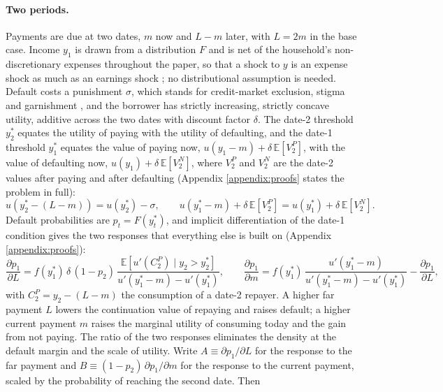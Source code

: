 \paragraph{Two periods.} Payments are due at two dates, $m$ now and $L - m$ later, with $L = 2m$ in the base case. Income $y_1$ is drawn from a distribution $F$ and is net of the household's non-discretionary expenses throughout the paper, so that a shock to $y$ is an expense shock as much as an earnings shock \citep{fulford_expense_2024}; no distributional assumption is needed. Default costs a punishment $\sigma$, which stands for credit-market exclusion, stigma and garnishment \citep{indarte_moral_2023}, and the borrower has strictly increasing, strictly concave utility, additive across the two dates with discount factor $\delta$. The date-2 threshold $y_2^*$ equates the utility of paying with the utility of defaulting, and the date-1 threshold $y_1^*$ equates the value of paying now, $u(y_1 - m) + \delta\,\mathbb{E}[V_2^P]$, with the value of defaulting now, $u(y_1) + \delta\,\mathbb{E}[V_2^N]$, where $V_2^P$ and $V_2^N$ are the date-2 values after paying and after defaulting (Appendix \ref{appendix:proofs} states the problem in full):
\begin{equation}\label{eq:threshold1}
u(y_2^* - (L - m)) = u(y_2^*) - \sigma, \qquad u(y_1^* - m) + \delta\,\mathbb{E}[V_2^P] = u(y_1^*) + \delta\,\mathbb{E}[V_2^N].
\end{equation}
Default probabilities are $p_t = F(y_t^*)$, and implicit differentiation of the date-1 condition gives the two responses that everything else is built on (Appendix \ref{appendix:proofs}):
\begin{equation}\label{eq:sensitivities}
\frac{\partial p_1}{\partial L} = f(y_1^*)\,\delta\,(1 - p_2)\,\frac{\mathbb{E}\left[u'(C_2^P) \mid y_2 > y_2^*\right]}{u'(y_1^* - m) - u'(y_1^*)}, \qquad
\frac{\partial p_1}{\partial m} = f(y_1^*)\,\frac{u'(y_1^* - m)}{u'(y_1^* - m) - u'(y_1^*)} - \frac{\partial p_1}{\partial L},
\end{equation}
with $C_2^P = y_2 - (L - m)$ the consumption of a date-2 repayer. A higher far payment $L$ lowers the continuation value of repaying and raises default; a higher current payment $m$ raises the marginal utility of consuming today and the gain from not paying. The ratio of the two responses eliminates the density at the default margin and the scale of utility. Write $A \equiv \partial p_1/\partial L$ for the response to the far payment and $B \equiv (1 - p_2)\,\partial p_1/\partial m$ for the response to the current payment, scaled by the probability of reaching the second date. Then
